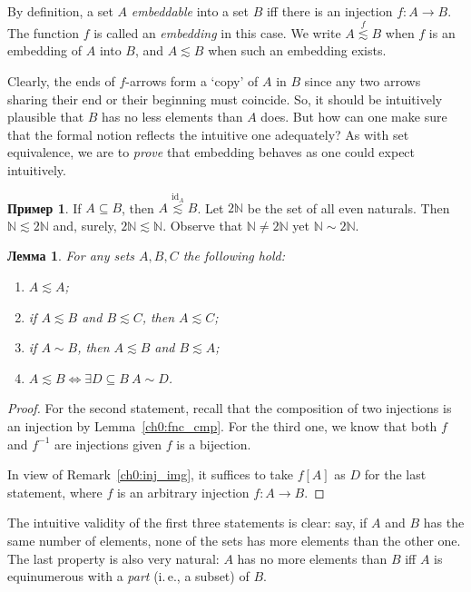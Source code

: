 \documentclass[12pt,notitlepage]{article}
\theoremstyle{plain}
\newtheorem{lemma}[thm]{Лемма}
\theoremstyle{definition}
\newtheorem{exm}[thm]{Пример}
\theoremstyle{plain}
\newcommand{\N}{\mathbb{N}}
\newcommand{\sbs}{\subseteq}
\newcommand{\id}{\mathrm{id}}
\newcommand{\1}{\mathbf{1}}
\newcommand{\0}{\mathbf{0}}
\begin{document}
By definition, a set $A$ \emph{embeddable} into a set $B$ iff there is an injection $f\colon A \to B$. The function $f$ is called an \emph{embedding} in this case. We write $A \stackrel{f}{\lesssim} B$ when $f$ is an embedding of $A$ into $B$, and $A \lesssim B$ when such an embedding exists.

Clearly, the ends of $f$-arrows form  a `copy' of $A$ in $B$ since any two arrows sharing their end or their beginning must coincide. So, it should be intuitively plausible that $B$ has no less elements than $A$ does. But how can one make sure that the formal notion reflects the intuitive one adequately? As with set equivalence, we are to \emph{prove} that embedding behaves as one could expect intuitively.

\begin{exm}
	If $A \sbs B$, then $A \stackrel{\id_A}{\lesssim} B$. Let $2\N$ be the set of all even naturals. Then $\N \lesssim 2\N$ and, surely, $2\N \lesssim \N$. Observe that $\N \neq 2\N$ yet $\N \sim 2\N$.
\end{exm}

\begin{lemma}\label{L9:l_emb}
	For any sets $A, B, C$ the following hold:
	\begin{enumerate}
		\item $A \lesssim A$;
		\item if $A \lesssim B$ and $B \lesssim C$, then $A \lesssim C$;
		\item if $A \sim B$, then $A \lesssim B$ and $B \lesssim A$;
		\item $A \lesssim B \iff \exists D \sbs B\ A \sim D$.
	\end{enumerate}
\end{lemma}
\begin{proof}
	For the second statement, recall that the composition of two injections is an injection by Lemma~\ref{ch0:fnc_cmp}. For the third one, we know that both $f$ and $f^{-1}$ are injections given $f$ is a bijection.
	
	In view of Remark~\ref{ch0:inj_img}, it suffices to take $f[A]$ as $D$ for the last statement, where $f$ is an arbitrary injection $f\colon A \to B$.
\end{proof}
The intuitive validity of the first three statements is clear: say, if $A$ and $B$ has the same number of elements, none of the sets has more elements than the other one. The last property is also very natural: $A$ has no more elements than $B$ iff $A$ is equinumerous with a \emph{part} (i.\,e., a subset) of $B$.
\end{document}
